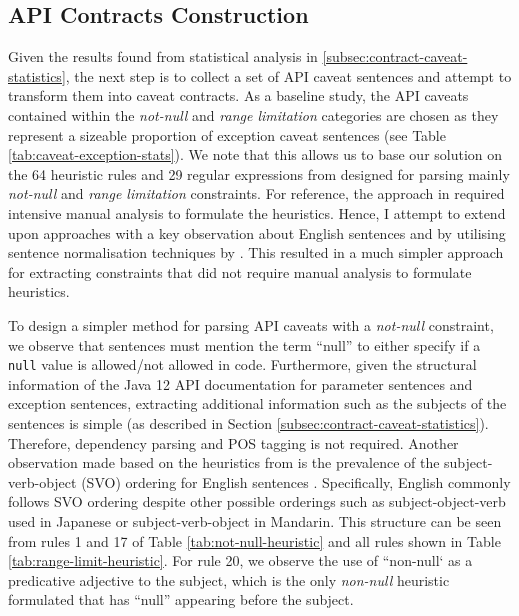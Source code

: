 \subsection{API Contracts Construction}
\label{subsec:contract-construct}
Given the results found from statistical analysis in \ref{subsec:contract-caveat-statistics}, the next step is to collect a set of API caveat sentences and attempt to transform them into caveat contracts. As a baseline study, the API caveats contained within the \textit{not-null} and \textit{range limitation} categories are chosen as they represent a sizeable proportion of exception caveat sentences (see Table \ref{tab:caveat-exception-stats}). 
We note that this allows us to base our solution on the 64 heuristic rules and 29 regular expressions from \cite{zhou-directive} designed for parsing mainly \textit{not-null} and \textit{range limitation} constraints. For reference, the approach in \cite{zhou-directive} required intensive manual analysis to formulate the heuristics. Hence, I attempt to extend upon  approaches with a key observation about English sentences and by utilising sentence normalisation techniques by \cite{blasi2018translating}. This resulted in a much simpler approach for extracting constraints that did not require manual analysis to formulate heuristics. \bigbreak

To design a simpler method for parsing API caveats with a \textit{not-null} constraint, we observe that sentences must mention the term ``null'' to either specify if a \lstinline{null} value is allowed/not allowed in code. Furthermore, given the structural information of the Java 12 API documentation for parameter sentences and exception sentences, extracting additional information such as the subjects of the sentences is simple (as described in Section \ref{subsec:contract-caveat-statistics}). Therefore, dependency parsing and POS tagging is not required. Another observation made based on the heuristics from \cite{zhou-directive} is the prevalence of the subject-verb-object (SVO) ordering for English sentences \cite{dryer200581}. Specifically, English commonly follows SVO ordering despite other possible orderings such as subject-object-verb used in Japanese or subject-verb-object in Mandarin. This structure can be seen from rules 1 and 17 of Table \ref{tab:not-null-heuristic} and all rules shown in Table \ref{tab:range-limit-heuristic}. For rule 20, we observe the use of ``non-null` as a predicative adjective to the subject, which is the only \textit{non-null} heuristic formulated that has ``null'' appearing before the subject. \bigbreak 

